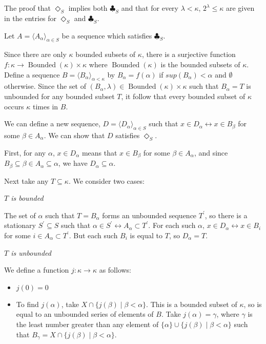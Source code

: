 \documentclass[12pt]{article}
\begin{document}
The proof that $\Diamond_S$ implies both $\clubsuit_S$ and that for every $\lambda<\kappa$, $2^\lambda\leq\kappa$ are given in the entries for $\Diamond_S$ and $\clubsuit_S$.

Let $A=\langle A_\alpha\rangle_{\alpha\in S}$ be a sequence which satisfies $\clubsuit_S$.

Since there are only $\kappa$ bounded subsets of $\kappa$, there is a surjective function $f:\kappa\rightarrow \operatorname{Bounded}(\kappa)\times\kappa$ where $\operatorname{Bounded}(\kappa)$ is the bounded subsets of $\kappa$.  Define a sequence $B=\langle B_\alpha\rangle_{\alpha<\kappa}$ by $B_\alpha=f(\alpha)$ if  $sup(B_\alpha)<\alpha$ and $\emptyset$ otherwise.  Since the set of $(B_\alpha,\lambda)\in \operatorname{Bounded}(\kappa)\times\kappa$ such that $B_\alpha=T$ is unbounded for any bounded subset $T$, it follow that every bounded subset of $\kappa$ occurs $\kappa$ times in $B$.

We can define a new sequence, $D=\langle D_\alpha\rangle_{\alpha\in S}$ such that $x\in D_\alpha\leftrightarrow x\in B_\beta$ for some $\beta\in A_\alpha$.  We can show that $D$ satisfies $\Diamond_S$.

First, for any $\alpha$, $x\in D_\alpha$ means that $x\in B_\beta$ for some $\beta\in A_\alpha$, and since $B_\beta\subseteq\beta\in A_\alpha\subseteq\alpha$, we have $D_\alpha\subseteq\alpha$.

Next take any $T\subseteq\kappa$.  We consider two cases:

\emph{$T$ is bounded}

The set of $\alpha$ such that $T=B_\alpha$ forms an unbounded sequence $T^\prime$, so there is a stationary $S^\prime\subseteq S$ such that $\alpha\in S^\prime\leftrightarrow A_\alpha\subset T^\prime$.  For each such $\alpha$, $x\in D_\alpha\leftrightarrow x\in B_i$ for some $i\in A_\alpha\subset T^\prime$.  But each such $B_i$ is equal to $T$, so $D_\alpha=T$.

\emph{$T$ is unbounded}

We define a function $j:\kappa\rightarrow\kappa$ as follows:

\begin{itemize}
\item $j(0)=0$

\item To find $j(\alpha)$, take $X\cap \{j(\beta)\mid\beta<\alpha\}$.  This is a bounded subset of $\kappa$, so is equal to an unbounded series of elements of $B$.  Take $j(\alpha)=\gamma$, where $\gamma$ is the least number greater than  any element of $\{\alpha\}\cup\{j(\beta)\mid\beta<\alpha\}$ such that $B_\gamma=X\cap \{j(\beta)\mid\beta<\alpha\}$.

\end{itemize}
\end{document}
